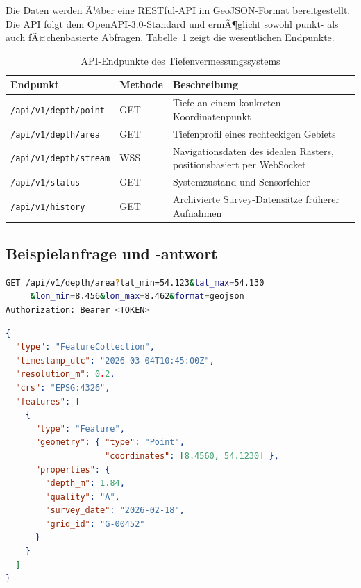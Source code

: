 ﻿\documentclass[a4paper,12pt]{article}
\theoremstyle{definition}
\begin{document}
Die Daten werden Ã¼ber eine RESTful-API im GeoJSON-Format bereitgestellt. Die API
folgt dem OpenAPI-3.0-Standard und ermÃ¶glicht sowohl punkt- als auch fÃ¤chenbasierte
Abfragen. Tabelle~\ref{tab:endpunkte} zeigt die wesentlichen Endpunkte.

\begin{table}[H]
\centering
\caption{API-Endpunkte des Tiefenvermessungssystems}
\label{tab:endpunkte}
\renewcommand{\arraystretch}{1.3}
\begin{tabular}{@{}p{5cm}p{2cm}p{6cm}@{}}
\toprule
\textbf{Endpunkt} & \textbf{Methode} & \textbf{Beschreibung} \\
\midrule
\texttt{/api/v1/depth/point} & GET & Tiefe an einem konkreten Koordinatenpunkt \\
\texttt{/api/v1/depth/area} & GET & Tiefenprofil eines rechteckigen Gebiets \\
\texttt{/api/v1/depth/stream} & WSS & Navigationsdaten des idealen Rasters, positionsbasiert per WebSocket \\
\texttt{/api/v1/status} & GET & Systemzustand und Sensorfehler \\
\texttt{/api/v1/history} & GET & Archivierte Survey-Datens\"{a}tze fr\"{u}herer Aufnahmen \\
\bottomrule
\end{tabular}
\end{table}

\subsection{Beispielanfrage und -antwort}

\begin{lstlisting}[language=bash, caption={HTTP-Anfrage an den Tiefen-Endpunkt}]
GET /api/v1/depth/area?lat_min=54.123&lat_max=54.130
     &lon_min=8.456&lon_max=8.462&format=geojson
Authorization: Bearer <TOKEN>
\end{lstlisting}

\begin{lstlisting}[language=json, caption={GeoJSON-Antwort (Ausschnitt)}]
{
  "type": "FeatureCollection",
  "timestamp_utc": "2026-03-04T10:45:00Z",
  "resolution_m": 0.2,
  "crs": "EPSG:4326",
  "features": [
    {
      "type": "Feature",
      "geometry": { "type": "Point",
                    "coordinates": [8.4560, 54.1230] },
      "properties": {
        "depth_m": 1.84,
        "quality": "A",
        "survey_date": "2026-02-18",
        "grid_id": "G-00452"
      }
    }
  ]
}
\end{lstlisting}
\end{document}
